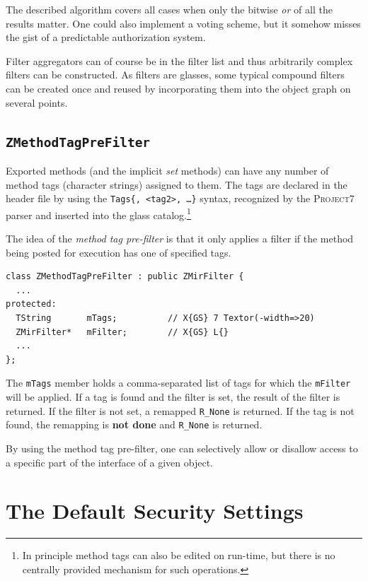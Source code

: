 \documentclass[a4paper,11pt]{article}
\def\p7{\textsc{Project7}\xspace}
\def\smalltt#1{{\small\texttt{#1}}}
\begin{document}
The described algorithm covers all cases when only the bitwise
\emph{or} of all the results matter. One could also implement a voting
scheme, but it somehow misses the gist of a predictable authorization
system.

Filter aggregators can of course be in the filter list and thus
arbitrarily complex filters can be constructed. As filters are
glasses, some typical compound filters can be created once and reused
by incorporating them into the object graph on several points.


\subsection{\texttt{ZMethodTagPreFilter}}

Exported methods (and the implicit \emph{set} methods) can have any
number of method tags (character strings) assigned to them. The tags
are declared in the header file by using the \smalltt{Tags\{<tag1>,
  <tag2>, \dots\}} syntax, recognized by the \p7 parser and inserted
into the glass catalog.\footnote{In principle method tags can also
  be edited on run-time, but there is no centrally provided mechanism
  for such operations.}

The idea of the \emph{method tag pre-filter} is that it only applies a
filter if the method being posted for execution has one of specified
tags.

{\footnotesize\begin{verbatim}
class ZMethodTagPreFilter : public ZMirFilter {
  ...
protected:
  TString       mTags;          // X{GS} 7 Textor(-width=>20)
  ZMirFilter*   mFilter;        // X{GS} L{}
  ...
};
\end{verbatim}
}

The \smalltt{mTags} member holds a comma-separated list of tags for
which the \smalltt{mFilter} will be applied. If a tag is found and the
filter is set, the result of the filter is returned. If the filter is
not set, a remapped \smalltt{R\_None} is returned. If the tag is not
found, the remapping is \textbf{not done} and \smalltt{R\_None} is
returned.

By using the method tag pre-filter, one can selectively allow or disallow
access to a specific part of the interface of a given object.


\section{The Default Security Settings}
\end{document}

